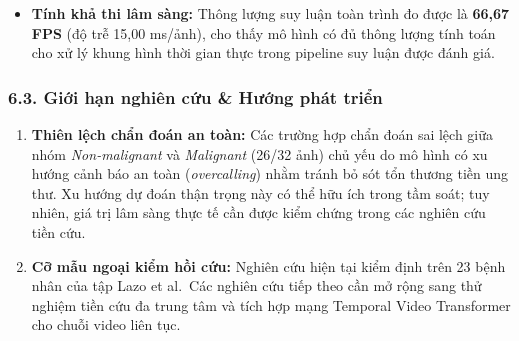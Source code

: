 \documentclass[
  11pt,
  a4paper,
]{article}
\providecommand{\tightlist}{%
  \setlength{\itemsep}{0pt}\setlength{\parskip}{0pt}}
\begin{document}
\begin{table}[H]
\centering
\caption{Bảng 6.2: Đánh giá độ trễ suy luận và thông lượng thực tế trên
thiết bị biên Apple Silicon MPS}
\label{tab:sec_table10}
\vspace{3pt}
\end{table}

\begin{itemize}
\tightlist
\item
  \textbf{Tính khả thi lâm sàng:} Thông lượng suy luận toàn trình đo
  được là \textbf{66,67 FPS} (độ trễ 15,00 ms/ảnh), cho thấy mô hình có
  đủ thông lượng tính toán cho xử lý khung hình thời gian thực trong
  pipeline suy luận được đánh giá.
\end{itemize}

\subsubsection{6.3. Giới hạn nghiên cứu \& Hướng phát
triển}\label{giux1edbi-hux1ea1n-nghiuxean-cux1ee9u-hux1b0ux1edbng-phuxe1t-triux1ec3n}

\begin{enumerate}
\def\labelenumi{\arabic{enumi}.}
\tightlist
\item
  \textbf{Thiên lệch chẩn đoán an toàn:} Các trường hợp chẩn đoán sai
  lệch giữa nhóm \emph{Non-malignant} và \emph{Malignant} (26/32 ảnh)
  chủ yếu do mô hình có xu hướng cảnh báo an toàn (\emph{overcalling})
  nhằm tránh bỏ sót tổn thương tiền ung thư. Xu hướng dự đoán thận trọng
  này có thể hữu ích trong tầm soát; tuy nhiên, giá trị lâm sàng thực tế
  cần được kiểm chứng trong các nghiên cứu tiền cứu.
\item
  \textbf{Cỡ mẫu ngoại kiểm hồi cứu:} Nghiên cứu hiện tại kiểm định trên
  23 bệnh nhân của tập Lazo et al.~Các nghiên cứu tiếp theo cần mở rộng
  sang thử nghiệm tiền cứu đa trung tâm và tích hợp mạng Temporal Video
  Transformer cho chuỗi video liên tục.
\end{enumerate}
\end{document}
